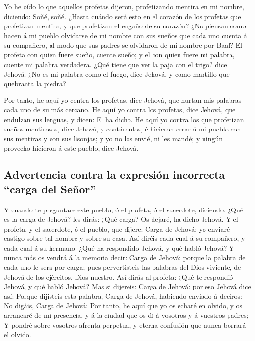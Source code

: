  Yo he oído lo que aquellos profetas dijeron, profetizando
mentira en mi nombre, diciendo: Soñé, soñé.  ¿Hasta cuándo
será esto en el corazón de los profetas que profetizan mentira, y que
profetizan el engaño de su corazón?  ¿No piensan como hacen
á mi pueblo olvidarse de mi nombre con sus sueños que cada uno cuenta á
su compañero, al modo que sus padres se olvidaron de mi nombre por Baal?
 El profeta con quien fuere sueño, cuente sueño; y el con
quien fuere mi palabra, cuente mi palabra verdadera. ¿Qué tiene que ver
la paja con el trigo? dice Jehová.  ¿No es mi palabra como
el fuego, dice Jehová, y como martillo que quebranta la piedra?

 Por tanto, he aquí yo contra los profetas, dice Jehová,
que hurtan mis palabras cada uno de su más cercano.  He
aquí yo contra los profetas, dice Jehová, que endulzan sus lenguas, y
dicen: El ha dicho.  He aquí yo contra los que profetizan
sueños mentirosos, dice Jehová, y contáronlos, é hicieron errar á mi
pueblo con sus mentiras y con sus lisonjas; y yo no los envié, ni les
mandé; y ningún provecho hicieron á este pueblo, dice Jehová.

\hypertarget{advertencia-contra-la-expresiuxf3n-incorrecta-carga-del-seuxf1or}{%
\subsection{Advertencia contra la expresión incorrecta ``carga del
Señor''}\label{advertencia-contra-la-expresiuxf3n-incorrecta-carga-del-seuxf1or}}

 Y cuando te preguntare este pueblo, ó el profeta, ó el
sacerdote, diciendo: ¿Qué es la carga de Jehová? les dirás: ¿Qué carga?
Os dejaré, ha dicho Jehová.  Y el profeta, y el sacerdote,
ó el pueblo, que dijere: Carga de Jehová; yo enviaré castigo sobre tal
hombre y sobre su casa.  Así diréis cada cual á su
compañero, y cada cual á su hermano: ¿Qué ha respondido Jehová, y qué
habló Jehová?  Y nunca más os vendrá á la memoria decir:
Carga de Jehová: porque la palabra de cada uno le será por carga; pues
pervertisteis las palabras del Dios viviente, de Jehová de los
ejércitos, Dios nuestro.  Así dirás al profeta: ¿Qué te
respondió Jehová, y qué habló Jehová?  Mas si dijereis:
Carga de Jehová: por eso Jehová dice así: Porque dijisteis esta palabra,
Carga de Jehová, habiendo enviado á deciros: No digáis, Carga de Jehová:
 Por tanto, he aquí que yo os echaré en olvido, y os
arrancaré de mi presencia, y á la ciudad que os dí á vosotros y á
vuestros padres;  Y pondré sobre vosotros afrenta perpetua,
y eterna confusión que nunca borrará el olvido.

